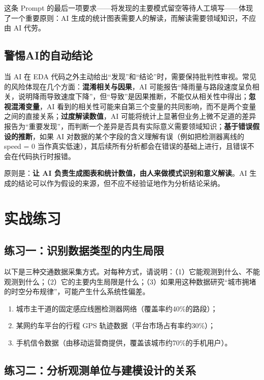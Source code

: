 这条 Prompt 的最后一项要求——将发现的主要模式留空等待人工填写——体现了一个重要原则：AI 生成的统计图表需要人的解读，而解读需要领域知识，不应由 AI 代劳。

\subsection{警惕AI的自动结论}

当 AI 在 EDA 代码之外主动给出“发现”和“结论”时，需要保持批判性审视。常见的风险体现在几个方面：\textbf{混淆相关与因果}，AI 可能报告“降雨量与路段速度呈负相关，说明降雨导致速度下降”，但“导致”是因果推断，不能仅从相关性中得出；\textbf{忽视混淆变量}，AI 看到的相关性可能来自第三个变量的共同影响，而不是两个变量之间的直接关系；\textbf{过度解读数值}，AI 可能将统计上显著但业务上微不足道的差异报告为“重要发现”，而判断一个差异是否具有实际意义需要领域知识；\textbf{基于错误假设的推断}，如果 AI 对数据的某个字段的含义理解有误（例如把检测器离线的 speed = 0 当作真实低速），其后续所有分析都会在错误的基础上进行，且错误不会在代码执行时报错。

原则是：\textbf{让 AI 负责生成图表和统计数值，由人来做模式识别和意义解读}。AI 生成的结论可以作为假设的来源，但不应不经验证地作为分析结论采纳。

\section{实战练习}

\subsection*{练习一：识别数据类型的内生局限}

以下是三种交通数据采集方式。对每种方式，请说明：（1）它能观测到什么、不能观测到什么；（2）它的主要内生局限是什么；（3）如果用这种数据研究“城市拥堵的时空分布规律”，可能产生什么系统性偏差。

\begin{enumerate}
  \item 城市主干道的固定感应线圈检测器网络（覆盖率约40\%的路段）；
  \item 某网约车平台的行程 GPS 轨迹数据（平台市场占有率约30\%）；
  \item 手机信令数据（由移动运营商提供，覆盖该城市约70\%的手机用户）。
\end{enumerate}

\subsection*{练习二：分析观测单位与建模设计的关系}

